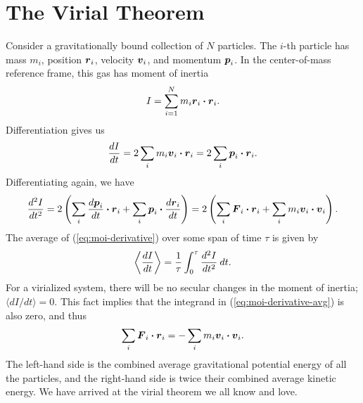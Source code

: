 \section{The Virial Theorem} \label{sec:derivation-virial-theorem}
Consider a gravitationally bound collection of $N$ particles. The $i$-th particle has mass $m_i$, position $\vb*{r}_i$, velocity $\vb*{v}_i$, and momentum $\vb*{p}_i$. In the center-of-mass reference frame, this gas has moment of inertia
\begin{align}
    I  = \sum_{i=1}^N m_i \vb*{r}_i \vdot \vb*{r}_i.
\end{align}
Differentiation gives us
\begin{align} \label{eq:moi-derivative}
    \dv{I}{t} = 2 \sum_i m_i \vb*{v}_i \vdot \vb*{r}_i = 2 \sum_i \vb*{p}_i \vdot \vb*{r}_i.
\end{align}
Differentiating again, we have
\begin{align}
    \dv[2]{I}{t} = 2 \left ( \sum_i \dv{\vb*{p}_i}{t} \vdot \vb*{r}_i + \sum_i \vb*{p}_i \vdot \dv{\vb*{r}_i}{t} \right ) = 2 \left ( \sum_i \vb*{F}_i \vdot \vb*{r}_i + \sum_i m_i \vb*{v}_i \vdot \vb*{v}_i \right ).
\end{align}
The average of (\ref{eq:moi-derivative}) over some span of time $\tau$ is given by
\begin{align} \label{eq:moi-derivative-avg}
    \left\langle \dv{I}{t} \right\rangle = \frac{1}{\tau} \int_0^\tau \dv[2]{I}{t} \: dt.
\end{align}
For a virialized system, there will be no secular changes in the moment of inertia; $\langle dI/dt \rangle = 0$. This fact implies that the integrand in (\ref{eq:moi-derivative-avg}) is also zero, and thus
\begin{align}
    \sum_i \vb*{F}_i \vdot \vb*{r}_i = -\sum_i m_i \vb*{v}_i \vdot \vb*{v}_i.
\end{align}
The left-hand side is the combined average gravitational potential energy of all the particles, and the right-hand side is twice their combined average kinetic energy.
We have arrived at the virial theorem we all know and love.


